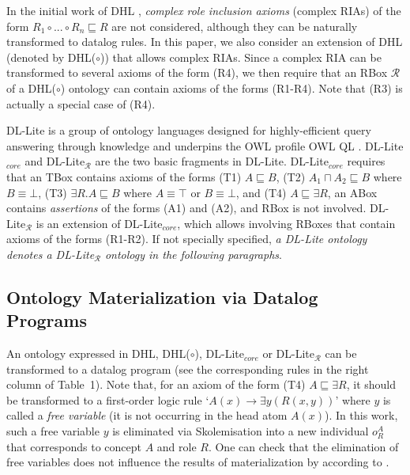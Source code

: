 \documentclass[final,1p,times]{elsarticle}
\begin{document}
In the initial work of DHL \cite{GrosofHVD03}, \emph{complex role inclusion axioms} (complex RIAs) of
the form $R_1\circ...\circ R_n\sqsubseteq R$ are not considered, although they can be
naturally transformed to datalog rules.
In this paper, we also consider an extension of DHL (denoted by DHL($\circ$))
that allows complex RIAs. Since a complex RIA can be transformed to
several axioms of the form (R4), we then require that an
RBox $\mathcal{R}$ of a DHL($\circ$) ontology can contain
axioms of the forms (R1-R4). Note that (R3) is actually a special
case of (R4).

DL-Lite is a group of ontology languages designed for highly-efficient
query answering through knowledge
and underpins the OWL profile OWL QL \cite{CalvaneseGLLR07}.
DL-Lite$_{core}$ and DL-Lite$_{\mathcal{R}}$ are the two basic fragments
in DL-Lite.
DL-Lite$_{core}$ requires that an TBox contains axioms of the forms (T1) $A\sqsubseteq B$,
(T2) $A_1\sqcap A_2\sqsubseteq B$ where $B\equiv\bot$, (T3) $\exists R.A\sqsubseteq B$
where $A\equiv\top$ or $B\equiv\bot$, and (T4) $A\sqsubseteq\exists R$,
an ABox contains \emph{assertions} of the forms (A1) and (A2), and
RBox is not involved. DL-Lite$_{\mathcal{R}}$ is an extension of DL-Lite$_{core}$,
which allows involving RBoxes that contain axioms of the forms (R1-R2).
If not specially specified, \emph{a DL-Lite ontology denotes a DL-Lite$_{\mathcal{R}}$ ontology
in the following paragraphs}.


\subsection{Ontology Materialization via Datalog Programs}

An ontology
expressed in DHL, DHL($\circ$), DL-Lite$_{core}$ or DL-Lite$_{\mathcal{R}}$ can be transformed to a datalog program
(see the corresponding rules in the right column of Table~1).
Note that, for an axiom of the form (T4) $A\sqsubseteq\exists R$, it should be transformed to
a first-order logic rule `$A(x)\rightarrow \exists y(R(x,y))$' where $y$ is called a \emph{free variable} (it is
not occurring in the head atom $A(x)$).
In this work, such a free variable $y$ is eliminated via Skolemisation into a new individual $o_{R}^A$
that corresponds to concept $A$ and role $R$. One can check that the elimination of free variables
does not influence the results of materialization by according to \cite{CalvaneseGLLR07}.
\end{document}
